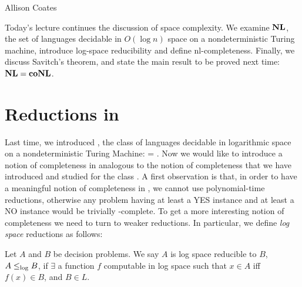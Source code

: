 


\newenvironment{proofidea}{\noindent {\sc Proof Idea:}}{\medskip} 


{Allison Coates 
}




Today's lecture continues the discussion of space complexity. We
examine $\nl$, the set of languages decidable in $O(\log {n})$ space on a
nondeterministic Turing machine, introduce log-space reducibility and
define nl-completeness. Finally, we discuss Savitch's theorem, and
state the main result to be proved next time: $\nl = \conl$.

\section{Reductions in \nl}

Last time, we introduced \nl, the class of languages decidable in
logarithmic space on a nondeterministic Turing Machine: \nl =
. Now we would like to introduce a notion
of completeness in \nl analogous to the notion of completeness
that we have introduced and studied for the class \np. A first
observation is that, in order to have a meaningful notion of
completeness in \nl, we cannot use polynomial-time reductions,
otherwise any \nl problem having at least a YES instance
and at least a NO instance would be trivially \nl-complete.
To get a more interesting notion of \nl completeness we need
to turn to weaker reductions.
In particular, we define {\em log space} reductions as follows:
\begin{Def}
    Let $A$ and $B$ be decision problems. We say $A$ is log space
    reducible to $B$, $A \leq_{\log} B$, if $\exists$ a function $f$
    computable in log space such that $x \in A$ iff $f(x) \in B$, and $B
    \in L$.
\end{Def}

